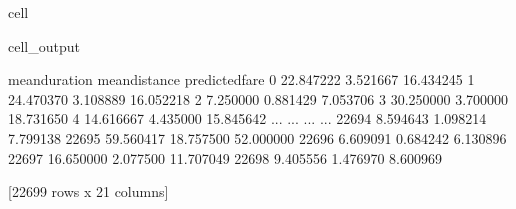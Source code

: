 \documentclass[letterpaper,10pt,english]{sphinxmanual}
\begin{document}
\begin{sphinxuseclass}{cell}
\begin{sphinxuseclass}{cell_output}
\begin{sphinxVerbatim}[commandchars=\\\{\}]
       mean\PYGZus{}duration  mean\PYGZus{}distance  predicted\PYGZus{}fare  
0          22.847222       3.521667       16.434245  
1          24.470370       3.108889       16.052218  
2           7.250000       0.881429        7.053706  
3          30.250000       3.700000       18.731650  
4          14.616667       4.435000       15.845642  
...              ...            ...             ...  
22694       8.594643       1.098214        7.799138  
22695      59.560417      18.757500       52.000000  
22696       6.609091       0.684242        6.130896  
22697      16.650000       2.077500       11.707049  
22698       9.405556       1.476970        8.600969  

[22699 rows x 21 columns]
\end{sphinxVerbatim}

\end{sphinxuseclass}
\end{sphinxuseclass}
\end{document}
